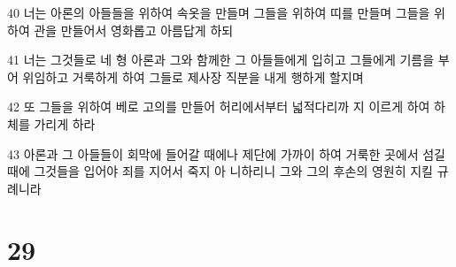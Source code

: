 \par 40 너는 아론의 아들들을 위하여 속옷을 만들며 그들을 위하여 띠를 만들며 그들을 위하여 관을 만들어서 영화롭고 아름답게 하되
\par 41 너는 그것들로 네 형 아론과 그와 함께한 그 아들들에게 입히고 그들에게 기름을 부어 위임하고 거룩하게 하여 그들로 제사장 직분을 내게 행하게 할지며
\par 42 또 그들을 위하여 베로 고의를 만들어 허리에서부터 넓적다리까 지 이르게 하여 하체를 가리게 하라
\par 43 아론과 그 아들들이 회막에 들어갈 때에나 제단에 가까이 하여 거룩한 곳에서 섬길 때에 그것들을 입어야 죄를 지어서 죽지 아 니하리니 그와 그의 후손의 영원히 지킬 규례니라

\chapter{29}

